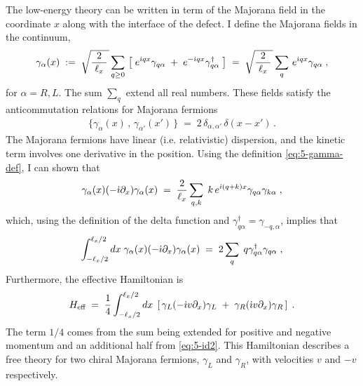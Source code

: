 The low-energy theory can be written in term of the Majorana field in the coordinate $x$ along with the interface of the defect. I define the Majorana fields in the continuum,
\begin{equation}
    \gamma_{\alpha}(x) \; := \; \sqrt{\frac{2}{\; \ell_x \; }\,} \sum_{q\geq 0} \, \left[ \; e^{\dot{\imath} q x} \gamma_{q\alpha} \; + \; e^{-\dot{\imath} q x} \gamma_{q\alpha}^{\dagger} \; \right] \; = \; \sqrt{\frac{2}{\; \ell_x \; }\,} \sum_{q} \,  e^{\dot{\imath} q x} \gamma_{q\alpha}  \; , \label{eq:5-gamma-def}
\end{equation}
for $\alpha = R, L$. The sum $\sum_{q}$ extend all real numbers. These fields satisfy the anticommutation relations for Majorana fermions
\begin{align}
    \{ \gamma_{\alpha}(x) \, , \, \gamma_{\alpha'}(x') \, \} \; = \; 2 \, \delta_{\alpha,\alpha'} \, \delta( x - x') \, .
\end{align}
The Majorana fermions have linear (i.e. relativistic) dispersion, and the kinetic term involves one derivative in the position. Using the definition \eqref{eq:5-gamma-def}, I can shown that
\begin{equation}
   \gamma_{\alpha}(x) (-\dot{\imath} \partial_x) \gamma_{\alpha}(x)\; = \;  \frac{2}{\ell_x} \sum_{q , k} \;  k \, e^{\dot{\imath} (q+k)x} \gamma_{q\alpha}  \gamma_{k\alpha} \; , 
\end{equation}
which, using the definition of the delta function and $\gamma_{q\alpha}^\dagger = \gamma_{-q,\alpha}$, implies that 
\begin{equation}
   \int_{-\ell_x/2}^{\ell_x/2} dx \; \gamma_{\alpha}(x) (-\dot{\imath} \partial_x) \gamma_{\alpha}(x)\; = \;  2 \sum_{q} \;  q \gamma_{q\alpha}^\dagger  \gamma_{q\alpha} \; , \label{eq:5-id2}
\end{equation}
Furthermore, the effective Hamiltonian is
\begin{equation}
    H_{\text{eff}} \; = \;  \frac{1}{4} \int_{-\ell_x/2}^{\ell_x/2} dx \; \left[ \, \gamma_{L} (- \dot{\imath} v \partial_x ) \gamma_{L} \; + \; \gamma_{R} ( \dot{\imath} v \partial_x ) \gamma_{R} \, \right]  \; . \label{eq:5-H-eff}
\end{equation}
The term $1/4$ comes from the sum being extended for positive and negative momentum and an additional half from \eqref{eq:5-id2}. This Hamiltonian describes a free theory for two chiral Majorana fermions, $\gamma_L $ and $\gamma_R$,  with velocities $v$ and $-v$ respectively.

